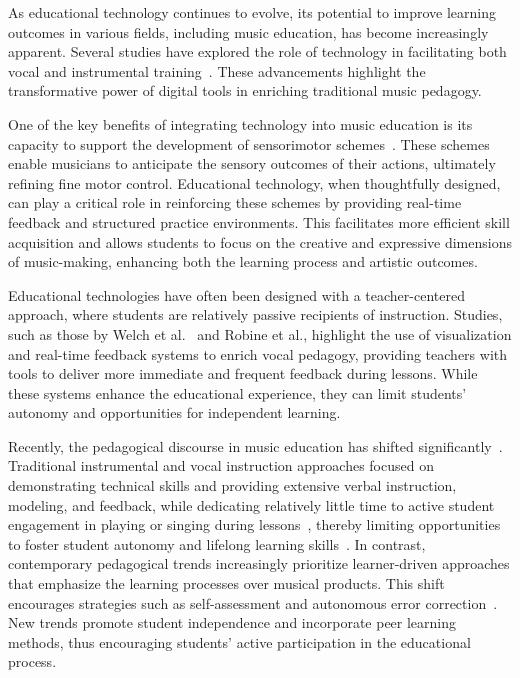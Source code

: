 \documentclass[runningheads]{llncs}
\begin{document}
As educational technology continues to evolve, its potential to improve learning outcomes in various fields, including music education, has become increasingly apparent. Several studies have explored the role of technology in facilitating both vocal and instrumental training~\cite{Webster12,Bauer20,Fiuza22}. These advancements highlight the transformative power of digital tools in enriching traditional music pedagogy.

One of the key benefits of integrating technology into music education is its capacity to support the development of sensorimotor schemes~\cite{Leman17}. These schemes enable musicians to anticipate the sensory outcomes of their actions, ultimately refining fine motor control. Educational technology, when thoughtfully designed, can play a critical role in reinforcing these schemes by providing real-time feedback and structured practice environments. This facilitates more efficient skill acquisition and allows students to focus on the creative and expressive dimensions of music-making, enhancing both the learning process and artistic outcomes.

Educational technologies have often been designed with a teacher-centered approach, where students are relatively passive recipients of instruction. Studies, such as those by Welch et al.~\cite{Welch05} and Robine et al.\cite{Robine07}, highlight the use of visualization and real-time feedback systems to enrich vocal pedagogy, providing teachers with tools to deliver more immediate and frequent feedback during lessons. While these systems enhance the educational experience, they can limit students’ autonomy and opportunities for independent learning.

Recently, the pedagogical discourse in music education has shifted significantly~\cite{Lennon12}. Traditional instrumental and vocal instruction approaches focused on demonstrating technical skills and providing extensive verbal instruction, modeling, and feedback, while dedicating relatively little time to active student engagement in playing or singing during lessons~\cite{Crocco21}, thereby limiting opportunities to foster student autonomy and lifelong learning skills~\cite{Gaunt08}.
In contrast, contemporary pedagogical trends increasingly prioritize learner-driven approaches that emphasize the learning processes over musical products. This shift encourages strategies such as self-assessment and autonomous error correction~\cite{Harrison14}. New trends promote student independence and incorporate peer learning methods, thus encouraging students’ active participation in the educational process.
\end{document}
